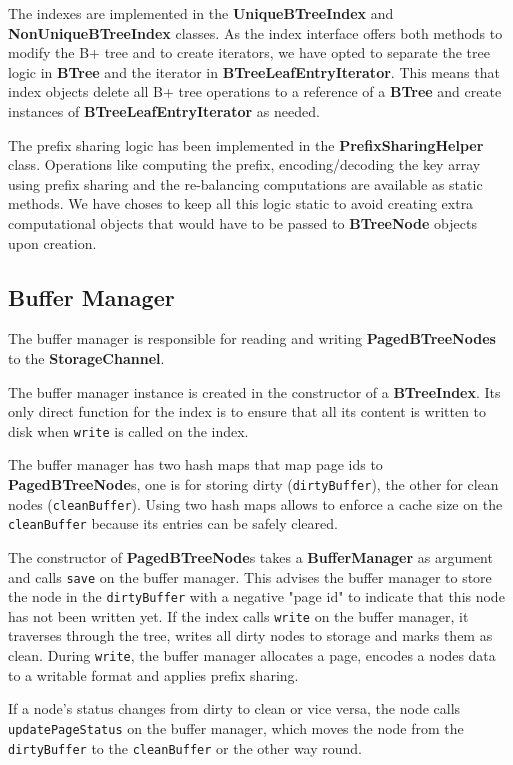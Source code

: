 \documentclass[11pt,a4paper,oneside]{article}
\begin{document}
The indexes are implemented in the \textbf{UniqueBTreeIndex} and \textbf{NonUniqueBTreeIndex} classes. As the index interface offers both methods to modify the B+ tree and to create iterators, we have opted to separate the tree logic in \textbf{BTree} and the iterator in \textbf{BTreeLeafEntryIterator}. This means that index objects delete all B+ tree operations to a reference of a \textbf{BTree} and create instances of \textbf{BTreeLeafEntryIterator} as needed.

The prefix sharing logic has been implemented in the \textbf{PrefixSharingHelper} class. Operations like computing the prefix, encoding/decoding the key array using prefix sharing and the re-balancing computations are available as static methods. We have choses to keep all this logic static to avoid creating extra computational objects that would have to be passed to \textbf{BTreeNode} objects upon creation.

\subsection{Buffer Manager} %
\label{sub:buffer_manager}
The buffer manager is responsible for reading and writing \textbf{PagedBTreeNodes} to the \textbf{StorageChannel}.

The buffer manager instance is created in the constructor of a \textbf{BTreeIndex}. 
Its only direct function for the index is to ensure that all its content is written to disk when \texttt{write} is called on the index.

The buffer manager has two hash maps that map page ids to \textbf{PagedBTreeNode}s, one is for storing dirty (\texttt{dirtyBuffer}), 
the other for clean nodes (\texttt{cleanBuffer}). 
Using two hash maps allows to enforce a cache size on the \texttt{cleanBuffer} because its entries can be safely cleared.

The constructor of \textbf{PagedBTreeNode}s takes a \textbf{BufferManager} as argument and calls \texttt{save} on the buffer manager.
This advises the buffer manager to store the node in the \texttt{dirtyBuffer} with a negative "page id" to indicate that this node has not been written yet.
If the index calls \texttt{write} on the buffer manager, it traverses through the tree, writes all dirty nodes to storage and marks them as clean.
During \texttt{write}, the buffer manager allocates a page, encodes a nodes data to a writable format and applies prefix sharing.

If a node's status changes from dirty to clean or vice versa, the node calls \texttt{updatePageStatus} on the buffer manager, 
which moves the node from the \texttt{dirtyBuffer} to the \texttt{cleanBuffer} or the other way round.
\end{document}

